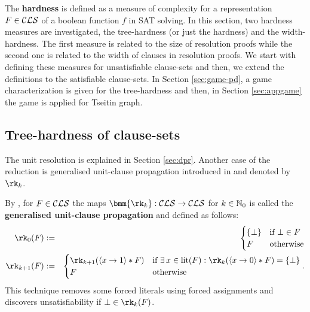 \documentclass{report}
\begin{document}
The \textbf{hardness} is defined as a measure of complexity for a representation $F \in \mathcal{CLS}$ of a boolean function $f$ in SAT solving. In this section, two hardness measures are investigated,  the tree-hardness (or just the hardness) and the width-hardness. The first measure is related to the size of resolution proofs while the second one is related to the width of clauses in resolution proofs. We start with defining these measures for unsatisfiable clause-sets and then, we extend the definitions to the satisfiable clause-sets. In Section \ref{sec:game-pd}, a game characterization is given for the tree-hardness and then, in Section \ref{sec:appgame} the game is applied for Tseitin graph.
\subsection{Tree-hardness of clause-sets}
\label{sec:Hardnessunsat}

The unit resolution is explained in Section \ref{sec:dpr}. Another case of the reduction is generalised unit-clause propagation introduced in \cite{Ku99b} and denoted by $\rk_k$. 

\begin{defi}\label{def:rk}
By \cite{Ku99b}, for $F \in \mathcal{CLS}$ the maps $\bmm{\rk_k}: \Cls \ra \Cls$ for $k \in \mathbb{N}_0$ is called the \textbf{generalised unit-clause propagation} and defined as follows:
  \begin{eqnarray*}
  \rk_0(F) & := &
  \begin{cases}
  \set{\bot} & \text{if } \bot \in F\\ F & \text{otherwise}
  \end{cases}\\
  \rk_{k+1}(F) & := &
  \begin{cases}
  \rk_{k+1}(\pao x1 * F) & \text{if } \ex\, x \in \lit(F) : \rk_k(\pao x0 * F) = \set{\bot}\\ F & \text{otherwise}
  \end{cases}.
  \end{eqnarray*}
This technique removes some forced literals using forced assignments and discovers unsatisfiability if $\bot \in \rk_k(F)$.
\end{defi} 
\end{document}
